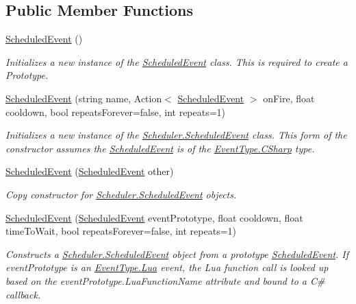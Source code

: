 \subsection*{Public Member Functions}
\begin{DoxyCompactItemize}
\item 
\hyperlink{class_scheduler_1_1_scheduled_event_a572dadae169da9d187678a0f1471389c}{Scheduled\+Event} ()
\begin{DoxyCompactList}\small\item\em Initializes a new instance of the \hyperlink{class_scheduler_1_1_scheduled_event}{Scheduled\+Event} class. This is required to create a Prototype. \end{DoxyCompactList}\item 
\hyperlink{class_scheduler_1_1_scheduled_event_afb2e9b906bfc695ed19bd9822f4de34b}{Scheduled\+Event} (string name, Action$<$ \hyperlink{class_scheduler_1_1_scheduled_event}{Scheduled\+Event} $>$ on\+Fire, float cooldown, bool repeats\+Forever=false, int repeats=1)
\begin{DoxyCompactList}\small\item\em Initializes a new instance of the \hyperlink{class_scheduler_1_1_scheduled_event}{Scheduler.\+Scheduled\+Event} class. This form of the constructor assumes the \hyperlink{class_scheduler_1_1_scheduled_event}{Scheduled\+Event} is of the \hyperlink{namespace_scheduler_a85a4e27de37756a9765a49f3b3e4ba81a83925001a044cdfe0c64e9a44345b66d}{Event\+Type.\+C\+Sharp} type. \end{DoxyCompactList}\item 
\hyperlink{class_scheduler_1_1_scheduled_event_a5c66e685b9eee065a1ff446c6b9eb68c}{Scheduled\+Event} (\hyperlink{class_scheduler_1_1_scheduled_event}{Scheduled\+Event} other)
\begin{DoxyCompactList}\small\item\em Copy constructor for \hyperlink{class_scheduler_1_1_scheduled_event}{Scheduler.\+Scheduled\+Event} objects. \end{DoxyCompactList}\item 
\hyperlink{class_scheduler_1_1_scheduled_event_a20a4e01a2ca9a54ed32f7f671f264a22}{Scheduled\+Event} (\hyperlink{class_scheduler_1_1_scheduled_event}{Scheduled\+Event} event\+Prototype, float cooldown, float time\+To\+Wait, bool repeats\+Forever=false, int repeats=1)
\begin{DoxyCompactList}\small\item\em Constructs a \hyperlink{class_scheduler_1_1_scheduled_event}{Scheduler.\+Scheduled\+Event} object from a prototype \hyperlink{class_scheduler_1_1_scheduled_event}{Scheduled\+Event}. If event\+Prototype is an \hyperlink{namespace_scheduler_a85a4e27de37756a9765a49f3b3e4ba81a0ae9478a1db9d1e2c48efa49eac1c7c6}{Event\+Type.\+Lua} event, the Lua function call is looked up based on the event\+Prototype.\+Lua\+Function\+Name attribute and bound to a C\# callback. \end{DoxyCompactList}\item 

\end{DoxyCompactItemize}
